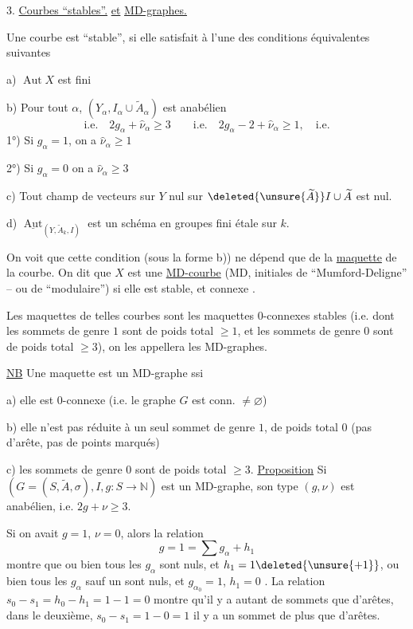 3. \uline{Courbes ``stables''.} \uline{et} \uline{MD-graphes.}

Une courbe   est ``stable'', si elle satisfait à l'une des conditions équivalentes suivantes

a) $\operatorname{Aut}X$ est fini

b) Pour tout $\alpha$, $(Y_\alpha,I_\alpha\cup\widetilde A_\alpha)$ est anabélien
\[
\text{i.e.}\quad 2g_\alpha+\widehat\nu_\alpha\geq3\qquad
\text{i.e.}\quad 2g_\alpha-2+\widehat\nu_\alpha\geq1,\quad\text{i.e.}
\]
1°) Si $g_\alpha=1$, on a $\widehat\nu_\alpha\geq1$

2°) Si $g_\alpha=0$ on a $\widehat\nu_\alpha\geq3$

c) Tout champ de vecteurs sur $Y$ nul sur $\deleted{\unsure{\widetilde A}}I\cup\widetilde A$ est nul.

d) $\underline{\operatorname{Aut}}_{(Y,\widetilde A_k,I)}$ est un schéma en groupes fini étale sur $k$.

On voit que cette condition (sous la forme b)) ne dépend que de la \uline{maquette} de la courbe. On dit que $X$ est une \uline{MD-courbe} (MD, initiales de ``Mumford-Deligne'' -- ou de ``modulaire'') si elle est stable, et connexe .

Les maquettes de telles courbes sont les maquettes $0$-connexes  stables (i.e. dont les sommets de genre $1$ sont de poids total $\geq1$, et les sommets de genre $0$ sont de poids total $\geq3$), on les appellera les MD-graphes.

\uline{NB} Une maquette est un MD-graphe ssi

a) elle est $0$-connexe (i.e. le graphe $G$ est conn. $\neq\varnothing$)

b) elle n'est pas réduite à un seul sommet de genre $1$, de poids total $0$ (pas d'arête, pas de points marqués)

c) les sommets de genre $0$ sont de poids total $\geq3$.
\uline{Proposition} Si $(G=(S,\widetilde A,\sigma),I,g:S\to\mathbb N)$ est un MD-graphe, son type $(g,\nu)$ est anabélien, i.e. $2g+\nu\geq3$.

Si on avait $g=1$, $\nu=0$, alors la relation
\[
g=1=\sum g_\alpha+h_1
\]
montre que ou bien tous les $g_\alpha$ sont nuls, et $h_1=1\deleted{\unsure{+1}}$, ou bien tous les $g_\alpha$ sauf un  sont nuls, et $g_{\alpha_0}=1$, $h_1=0$ .  La relation $s_0-s_1=h_0-h_1=1-1=0$ montre qu'il y a autant de sommets que d'arêtes, dans le deuxième, $s_0-s_1=1-0=1$ il y a un sommet de plus que d'arêtes.

